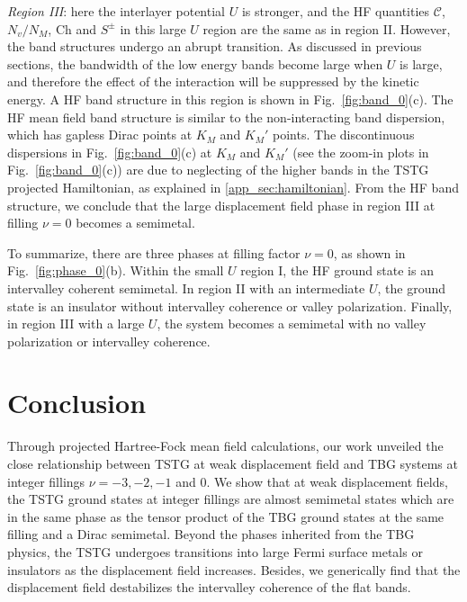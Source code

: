 \documentclass[prb,aps,nofootinbib,amssymb,twocolumn,superscriptaddress,10pt]{revtex4-2}
\begin{document}
{\it Region III}: here the interlayer potential $U$ is stronger, and the HF quantities $\mathcal{C}$, $N_v/N_M$, $\mathrm{Ch}$ and $S^\pm$ in this large $U$ region are the same as in region II. However, the band structures undergo an abrupt transition. As discussed in previous sections, the bandwidth of the low energy bands become large when $U$ is large, and therefore the effect of the interaction will be suppressed by the kinetic energy. A HF band structure in this region is shown in Fig.~\ref{fig:band_0}(c). The HF mean field band structure is similar to the non-interacting band dispersion, which has gapless Dirac points at $K_M$ and $K_M'$ points. The discontinuous dispersions in Fig.~\ref{fig:band_0}(c) at $K_M$ and $K_M'$ (see the zoom-in plots in Fig.~\ref{fig:band_0}(c)) are due to neglecting of the higher bands in the TSTG projected Hamiltonian, as explained in \ref{app_sec:hamiltonian}. 
From the HF band structure, we conclude that the large displacement field phase in region III at filling $\nu=0$ becomes a semimetal.

To summarize, there are three phases at filling factor $\nu=0$, as shown in Fig.~\ref{fig:phase_0}(b). Within the small $U$ region I, the HF ground state is an intervalley coherent semimetal. In region II with an intermediate $U$, the ground state is an insulator without intervalley coherence or valley polarization. Finally, in region III with a large $U$, the system becomes a semimetal with no valley polarization or intervalley coherence. 


\section{Conclusion}

Through projected Hartree-Fock mean field calculations, our work unveiled the close relationship between TSTG at weak displacement field and TBG systems at integer fillings $\nu=-3, -2, -1$ and $0$. We show that at weak displacement fields, the TSTG ground states at integer fillings are almost semimetal states which are in the same phase as the tensor product of the TBG ground states at the same filling and a Dirac semimetal. Beyond the phases inherited from the TBG physics, the TSTG undergoes transitions into large Fermi surface metals or insulators as the displacement field increases. Besides, we generically find that the displacement field destabilizes the intervalley coherence of the flat bands. 
\end{document}
